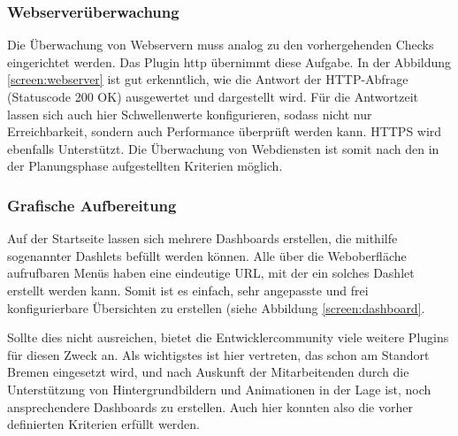 \subsubsection{Webserverüberwachung}
\label{sec:ÜberwachungWebserver}
Die Überwachung von Webservern muss analog zu den vorhergehenden Checks eingerichtet werden. Das Plugin \glqq{}http\grqq{} übernimmt diese Aufgabe.  In der Abbildung \ref{screen:webserver} ist gut erkenntlich, wie die Antwort der \ac{HTTP}-Abfrage (Statuscode 200 OK) ausgewertet und dargestellt wird. Für die Antwortzeit lassen sich auch hier Schwellenwerte konfigurieren, sodass nicht nur Erreichbarkeit, sondern auch Performance überprüft werden kann. HTTPS wird ebenfalls Unterstützt. Die Überwachung von Webdiensten ist somit nach den in der Planungsphase aufgestellten Kriterien möglich.

\subsubsection{Grafische Aufbereitung}
\label{sec:GrafischeAufbereitung}
Auf der Startseite lassen sich mehrere Dashboards erstellen, die mithilfe sogenannter \glqq{}Dashlets\grqq{} befüllt werden können. Alle über die Weboberfläche aufrufbaren Menüs haben eine eindeutige \ac{URL}, mit der ein solches Dashlet erstellt werden kann. Somit ist es einfach, sehr angepasste  und frei konfigurierbare Übersichten zu erstellen (siehe Abbildung \ref{screen:dashboard}.

Sollte dies nicht ausreichen, bietet die Entwicklercommunity viele weitere Plugins für diesen Zweck an. Als wichtigstes ist hier  vertreten, das schon am Standort Bremen eingesetzt wird, und nach Auskunft der Mitarbeitenden durch die Unterstützung von Hintergrundbildern und Animationen in der Lage ist, noch ansprechendere Dashboards zu erstellen. Auch hier konnten also die vorher definierten Kriterien erfüllt werden.